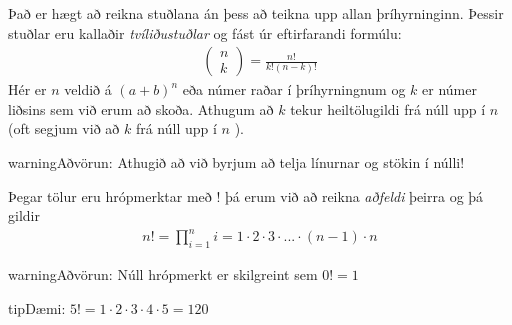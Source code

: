 \documentclass[a4paper,10pt,icelandic]{sphinxmanual}
\begin{document}
Það er hægt að reikna stuðlana án þess að teikna upp allan þríhyrninginn.
Þessir stuðlar eru kallaðir \textit{tvíliðustuðlar} og fást úr eftirfarandi formúlu:
\begin{equation*}
\begin{split}\begin{pmatrix} n \\ k \end{pmatrix} = \frac{n!}{k!(n-k)!}\end{split}
\end{equation*}
Hér er \(n\) veldið á \((a+b)^n\) eða númer raðar í þríhyrningnum og \(k\) er númer liðsins sem við erum að skoða.
Athugum að \(k\) tekur heiltölugildi frá núll upp í \(n\) (oft segjum við að \(k\)  frá núll upp í \(n\) ).

\begin{sphinxadmonition}{warning}{Aðvörun:}
Athugið að við byrjum að telja línurnar og stökin í núlli!
\end{sphinxadmonition}

Þegar tölur eru hrópmerktar með ! þá erum við að reikna \textit{aðfeldi} þeirra og þá gildir
\begin{equation*}
\begin{split}n! = \prod_{i=1}^{n}i = 1 \cdot 2 \cdot 3 \cdot ... \cdot (n-1) \cdot n\end{split}
\end{equation*}
\begin{sphinxadmonition}{warning}{Aðvörun:}
Núll hrópmerkt er skilgreint sem \(0!=1\)
\end{sphinxadmonition}

\begin{sphinxadmonition}{tip}{Dæmi:}
\(5! = 1\cdot 2\cdot 3\cdot 4\cdot 5 = 120\)
\end{sphinxadmonition}
\end{document}
